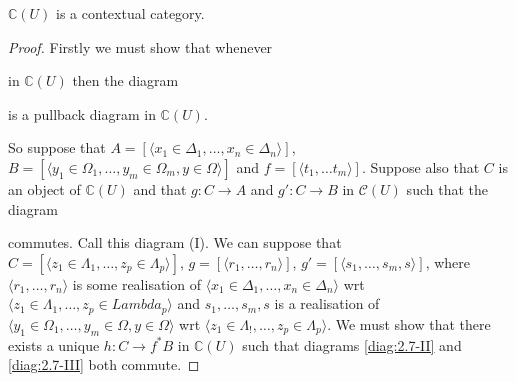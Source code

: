 \begin{lemma}
  \(\mathbb C (U)\) is a contextual category.
\end{lemma}
%
%

\begin{proof}
  Firstly we must show that whenever
    \begin{center}
    \end{center}

    in \(\mathbb C(U)\) then the diagram
    \begin{center}
    \end{center}

    is a pullback diagram in \(\mathbb C(U)\).

    So suppose that \(A = [\langle x_1 \in \Delta_1, \ldots, x_n \in \Delta_n \rangle]\), \(B = [\langle y_1 \in \Omega_1, \ldots, y_m \in \Omega_m, y \in \Omega \rangle]\) and \(f = [\langle t_1, \ldots t_m \rangle]\). Suppose also that \(C\) is an object of \(\mathbb C(U)\) and that \(g:C \rightarrow A\) and \(g':C \rightarrow B\) in \(\mathcal C(U)\) such that the diagram

    \begin{center}
    \end{center}
    commutes. Call this diagram (I). We can suppose that \(C = [\langle z_1 \in \Lambda_1, \ldots, z_p \in \Lambda_p \rangle]\), \(g = [\langle r_1, \ldots, r_n \rangle]\), \(g' = [\langle s_1, \ldots, s_m, s \rangle]\), where \(\langle r_1, \ldots, r_n \rangle\) is some realisation of \(\langle x_1 \in \Delta_1, \ldots, x_n \in \Delta_n \rangle\) wrt \(\langle z_1 \in \Lambda_1, \ldots, z_p \in Lambda_p \rangle\) and \(s_1, \ldots, s_m, s\) is a realisation of \(\langle y_1 \in \Omega_1, \ldots, y_m \in \Omega, y \in \Omega \rangle\) wrt \(\langle z_1 \in \Lambda_!, \ldots, z_p \in \Lambda_p \rangle\).
    We must show that there exists a unique \(h:C \rightarrow f^*B\) in \(\mathbb C(U)\) such that diagrams \ref{diag:2.7-II} and \ref{diag:2.7-III} both commute.


\end{proof}
